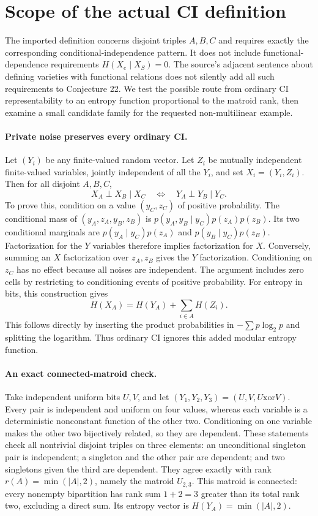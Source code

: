 \documentclass[11pt]{article}
\begin{document}
\section{Scope of the actual CI definition}
The imported definition concerns disjoint triples $A,B,C$ and requires
exactly the corresponding conditional-independence pattern. It does not
include functional-dependence requirements $H(X_e\mid X_S)=0$.
The source's adjacent sentence about defining varieties with functional
relations does not silently add all such requirements to Conjecture 22.
We test the possible route from ordinary CI representability to an
entropy function proportional to the matroid rank, then examine a small
candidate family for the requested non-multilinear example.

\paragraph{Private noise preserves every ordinary CI.}
Let $(Y_i)$ be any finite-valued random vector. Let $Z_i$ be mutually
independent finite-valued variables, jointly independent of all the
$Y_i$, and set $X_i=(Y_i,Z_i)$. Then for all disjoint $A,B,C$,
\[
X_A\perp X_B\mid X_C\quad\Longleftrightarrow\quad
Y_A\perp Y_B\mid Y_C.
\]
To prove this, condition on a value $(y_C,z_C)$ of positive probability.
The conditional mass of $(y_A,z_A,y_B,z_B)$ is
$p(y_A,y_B\mid y_C)p(z_A)p(z_B)$. Its two conditional marginals
are $p(y_A\mid y_C)p(z_A)$ and $p(y_B\mid y_C)p(z_B)$.
Factorization for the $Y$ variables therefore implies factorization for
$X$. Conversely, summing an $X$ factorization over $z_A,z_B$ gives
the $Y$ factorization. Conditioning on $z_C$ has no effect because
all noises are independent. The argument includes zero cells by
restricting to conditioning events of positive probability.
For entropy in bits, this construction gives
\[
H(X_A)=H(Y_A)+\sum_{i\in A}H(Z_i).
\]
This follows directly by inserting the product probabilities in
$-\sum p\log_2p$ and splitting the logarithm. Thus ordinary CI ignores
this added modular entropy function.

\paragraph{An exact connected-matroid check.}
Take independent uniform bits $U,V$, and let
$(Y_1,Y_2,Y_3)=(U,V,U\mathbin{\mathrm{xor}}V)$.
Every pair is independent and uniform on four values, whereas each
variable is a deterministic nonconstant function of the other two.
Conditioning on one variable makes the other two bijectively related,
so they are dependent. These statements check all nontrivial disjoint
triples on three elements: an unconditional singleton pair is independent;
a singleton and the other pair are dependent; and two singletons given
the third are dependent. They agree exactly with rank
$r(A)=\min(|A|,2)$, namely the matroid $U_{2,3}$.
This matroid is connected: every nonempty bipartition has rank sum
$1+2=3$ greater than its total rank two, excluding a direct sum.
Its entropy vector is $H(Y_A)=\min(|A|,2)$.
\end{document}
